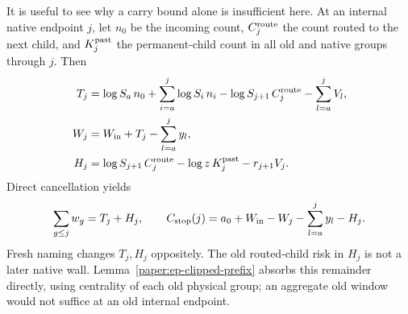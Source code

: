 It is useful to see why a carry bound alone is insufficient here.
At an internal native endpoint $j$, let $n_0$ be the incoming count,
$C_j^{\rm route}$ the count routed to the next child, and $K_j^{\rm past}$
the permanent-child count in all old and native groups through $j$.
Then
\begin{align*}
 T_j&=\log S_a\,n_0+\sum_{i=a}^j\log S_i\,n_i
       -\log S_{j+1}\,C_j^{\rm route}-\sum_{l=a}^jV_l,\\
 W_j&=W_{\rm in}+T_j-\sum_{l=a}^jy_l,\\
 H_j&=\log S_{j+1}\,C_j^{\rm route}
                   -\log z\,K_j^{\rm past}-r_{j+1}V_j.
\end{align*}
Direct cancellation yields
\begin{equation}\label{paper:ep-signed-stop}
 \sum_{g\leq j}w_g=T_j+H_j,\qquad
 C_{\rm stop}(j)=a_0+W_{\rm in}-W_j-\sum_{l=a}^jy_l-H_j.
\end{equation}
Fresh naming changes $T_j,H_j$ oppositely.  The old routed-child risk
in $H_j$ is not a later native wall.  Lemma~\ref{paper:ep-clipped-prefix}
absorbs this remainder directly, using centrality of each old physical
group; an aggregate old window would not suffice at an old internal
endpoint.

